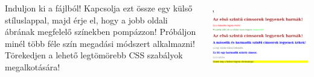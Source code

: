 \begin{frame}
  \begin{columns}[c]
      Induljon ki a  
      fájlból! Kapcsolja ezt össze egy külső stíluslappal, majd 
      érje el, hogy a jobb oldali ábrának megfelelő színekben 
      pompázzon! Próbáljon minél több féle szín megadási 
      módszert alkalmazni! Törekedjen a lehető legtömörebb CSS 
      szabályok megalkotására!
      \begin{exampleblock}{, 
        }
        \includegraphics[width=\textwidth]{szinezes-mo.png}
      \end{exampleblock}
  \end{columns} 
\end{frame}
